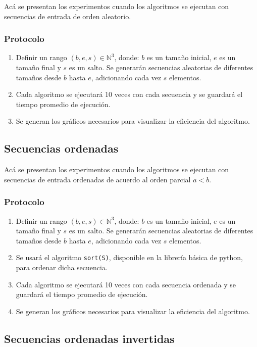 \documentclass[letter]{article}
\begin{document}
Acá se presentan los experimentos cuando los algoritmos se ejecutan con secuencias de entrada de orden aleatorio.

\subsubsection{Protocolo}
\begin{enumerate}
    \item Definir un rango $(b,e,s)\in\mathbb{N}^3$, donde: $b$ es un tamaño inicial, $e$ es un tamaño final y $s$ es un salto. Se generarán secuencias aleatorias de diferentes tamaños desde $b$ hasta $e$, adicionando cada vez $s$ elementos.
    \item Cada algoritmo se ejecutará 10 veces con cada secuencia y se guardará el tiempo promedio de ejecución.
    \item Se generan los gráficos necesarios para visualizar la eficiencia del algoritmo.
\end{enumerate}

\subsection{Secuencias ordenadas} \label{experimentos:ordenadas}

Acá se presentan los experimentos cuando los algoritmos se ejecutan con secuencias de entrada ordenadas de acuerdo al orden parcial $a<b$.

\subsubsection{Protocolo}
\begin{enumerate}
    \item Definir un rango $(b,e,s)\in\mathbb{N}^3$, donde: $b$ es un tamaño inicial, $e$ es un tamaño final y $s$ es un salto. Se generarán secuencias aleatorias de diferentes tamaños desde $b$ hasta $e$, adicionando cada vez $s$ elementos.
    \item Se usará el algoritmo \texttt{sort(S)}, disponible en la librería básica de python, para ordenar dicha secuencia.
    \item Cada algoritmo se ejecutará 10 veces con cada secuencia ordenada y se guardará el tiempo promedio de ejecución.
    \item Se generan los gráficos necesarios para visualizar la eficiencia del algoritmo.
\end{enumerate}

\subsection{Secuencias ordenadas invertidas} \label{experimentos:invertidas}
\end{document}

